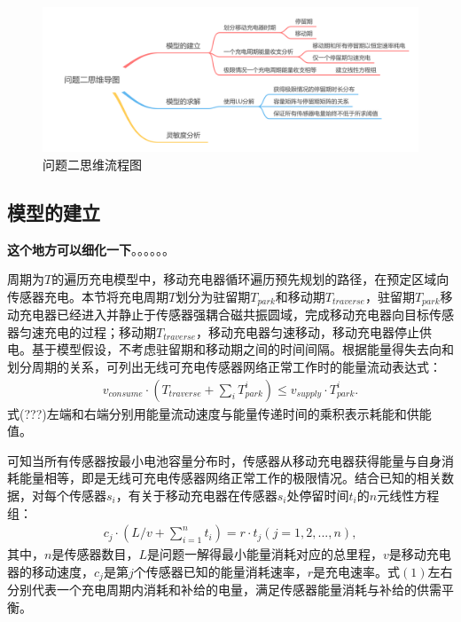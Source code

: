 \documentclass{whutmod}
\begin{document}
			\begin{figure}[H]
				\centering
				\includegraphics[width=\textwidth]{figures/222222.png}
				\caption{问题二思维流程图}\label{lssssct}
			\end{figure}
		
		\subsection{模型的建立}
			\textbf{这个地方可以细化一下}。。。。。。
			
			周期为$T$的遍历充电模型中，移动充电器循环遍历预先规划的路径，在预定区域向传感器充电。本节将充电周期$T$划分为驻留期$T_{park}$和移动期$T_{traverse}$，驻留期$T_{park}$移动充电器已经进入并静止于传感器强耦合磁共振圆域，完成移动充电器向目标传感器匀速充电的过程；移动期$T_{traverse}$，移动充电器匀速移动，移动充电器停止供电。基于模型假设，不考虑驻留期和移动期之间的时间间隔。根据能量得失去向和划分周期的关系，可列出无线可充电传感器网络正常工作时的能量流动表达式：
			\begin{gather}
			v_{consume}\cdot (T_{traverse}+\sum_{i} T_{park}^i)\leq v_{supply}\cdot T_{park}^i.
			\end{gather}
			式(???)左端和右端分别用能量流动速度与能量传递时间的乘积表示耗能和供能值。
			
			可知当所有传感器按最小电池容量分布时，传感器从移动充电器获得能量与自身消耗能量相等，即是无线可充电传感器网络正常工作的极限情况。结合已知的相关数据，对每个传感器$s_i$，有关于移动充电器在传感器$s_i$处停留时间$t_i$的$n$元线性方程组：
			\begin{gather}
			c_{j} \cdot (L/v+\sum_{i=1}^{n}t_i)=r \cdot t_j (j=1,2,...,n),
			\end{gather}
			其中，$n$是传感器数目，$L$是问题一解得最小能量消耗对应的总里程，$v$是移动充电器的移动速度，$c_{j}$是第$j$个传感器已知的能量消耗速率，$r$是充电速率。式$(1)$左右分别代表一个充电周期内消耗和补给的电量，满足传感器能量消耗与补给的供需平衡。
			
\end{document}
